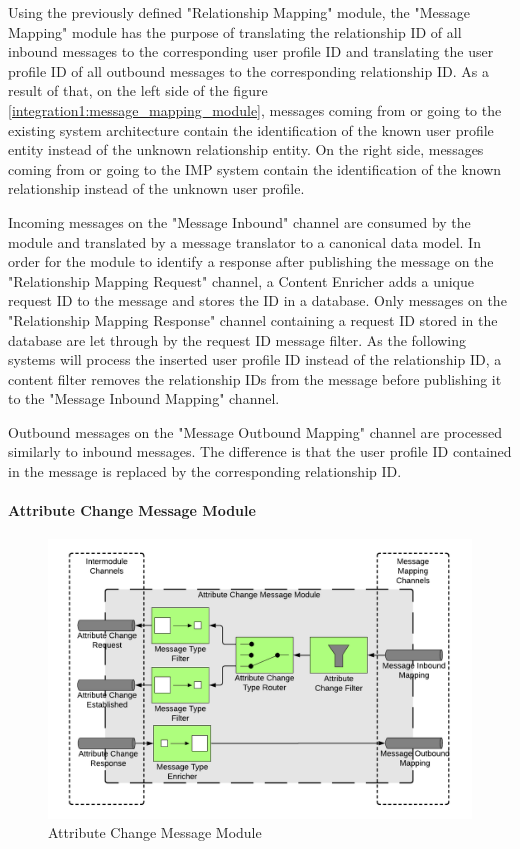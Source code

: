 Using the previously defined "Relationship Mapping" module, the "Message Mapping" module has the purpose of translating the relationship ID of all inbound messages to the corresponding user profile ID and translating the user profile ID of all outbound messages to the corresponding relationship ID. As a result of that, on the left side of the figure \ref{integration1:message_mapping_module}, messages coming from or going to the existing system architecture contain the identification of the known user profile entity instead of the unknown relationship entity. On the right side, messages coming from or going to the IMP system contain the identification of the known relationship instead of the unknown user profile.

Incoming messages on the "Message Inbound" channel are consumed by the module and translated by a message translator to a canonical data model. In order for the module to identify a response after publishing the message on the "Relationship Mapping Request" channel, a Content Enricher adds a unique request ID to the message and stores the ID in a database. Only messages on the "Relationship Mapping Response" channel containing a request ID stored in the database are let through by the request ID message filter. As the following systems will process the inserted user profile ID instead of the relationship ID, a content filter removes the relationship IDs from the message before publishing it to the "Message Inbound Mapping" channel.

Outbound messages on the "Message Outbound Mapping" channel are processed similarly to inbound messages. The difference is that the user profile ID contained in the message is replaced by the corresponding relationship ID.

\paragraph{Attribute Change Message Module}

\begin{figure}[h!]
    \centering
    \includegraphics[scale=0.6]{Diagrams/Integration Architecture 1/Technological Integration/11. Attribute Change Message Module.pdf}
    \caption{Attribute Change Message Module}
    \label{integration1:attribute_change_message_module}
\end{figure}

